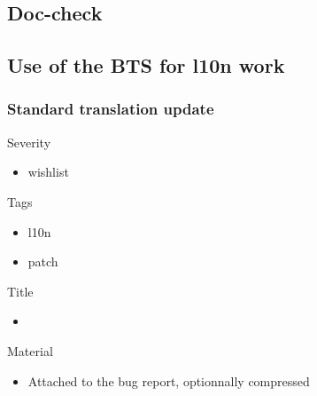 \documentclass{beamer}
\begin{document}

\subsection{Doc-check}

\begin{frame}
  \frametitle{}
\end{frame}

\begin{frame}
  \frametitle{}
\end{frame}

\begin{frame}
  \frametitle{}
\end{frame}

\subsection{Use of the BTS for l10n work}

\begin{frame}
  \frametitle{Standard translation update}
	\begin{block}
		{Severity}
		\begin{itemize}
		\item
			wishlist
		\end{itemize}
	\end{block}
	\begin{block}
		{Tags}
		\begin{itemize}
		\item
			l10n
		\item
			patch
		\end{itemize}
	\end{block}
	\begin{block}
		{Title}
		\begin{itemize}
		\item
		\end{itemize}
	\end{block}
	\begin{block}
		{Material}
		\begin{itemize}
		\item
			Attached to the bug report, optionnally compressed
		\end{itemize}
	\end{block}
\end{frame}

\begin{frame}
  \frametitle{}
\end{frame}
\end{document}
